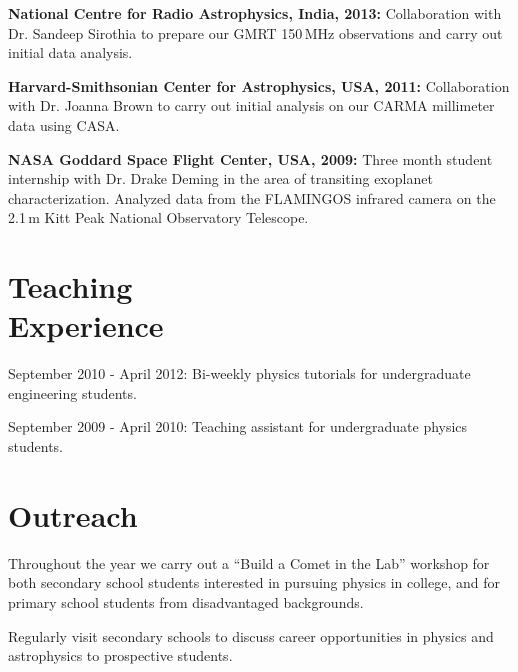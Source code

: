 \documentclass[margin,line]{resume}
\begin{document}
\begin{resume}
\textbf{National Centre for Radio Astrophysics, India, 2013:} Collaboration with Dr. Sandeep Sirothia to prepare our GMRT 150\,MHz observations and carry out initial data analysis.

\textbf{Harvard-Smithsonian Center for Astrophysics, USA, 2011:} Collaboration with Dr. Joanna Brown to carry out initial analysis on our CARMA millimeter data using CASA. 

\textbf{NASA Goddard Space Flight Center, USA, 2009:} Three month student internship with Dr. Drake Deming in the area of transiting exoplanet characterization. Analyzed data from the FLAMINGOS infrared camera on the 2.1\,m Kitt Peak National Observatory Telescope.

    \section{\mysidestyle Teaching\\Experience}

	\begin{list2}
    \item September 2010 - April 2012: Bi-weekly physics tutorials for undergraduate engineering students.
    \item September 2009 - April 2010: Teaching assistant for undergraduate physics students. \vspace{-1mm}\\%
    \end{list2}

    \section{\mysidestyle Outreach}

	\begin{list2}
    \item Throughout the year we carry out a ``Build a Comet in the Lab'' workshop for both secondary school students interested in pursuing physics in college, and for primary school students from disadvantaged backgrounds.
    \item Regularly visit secondary schools to discuss career opportunities in physics and astrophysics to prospective students.\vspace{-1mm}\\%
    \end{list2}



\end{resume}
\end{document}
